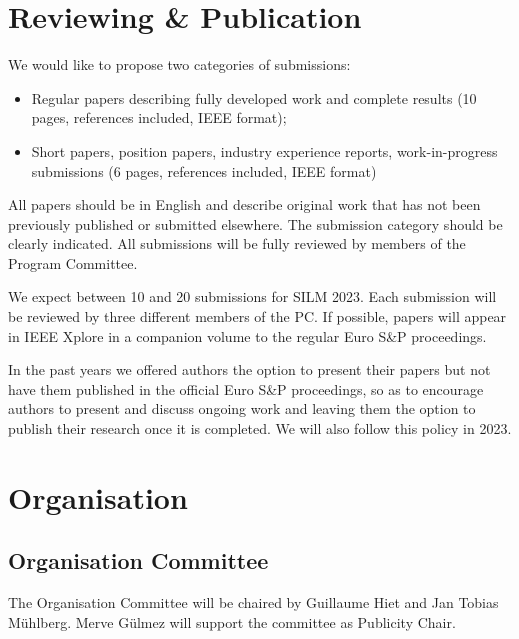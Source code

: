 \documentclass[a4paper,11pt]{article}
\newcommand{\SILMYear}{2023}
\begin{document}
\section{Reviewing \& Publication}
%
We would like to propose two categories of submissions:
%
\begin{itemize}
%
    \item Regular papers describing fully developed work and complete
results (10 pages, references included, IEEE format);
%
    \item Short papers, position papers, industry experience reports,
work-in-progress submissions (6 pages, references included, IEEE format)
%
\end{itemize}

All papers should be in English and describe original work that has not
been previously published or submitted elsewhere. The submission category
should be clearly indicated. All submissions will be fully reviewed by
members of the Program Committee.

We expect between 10 and 20 submissions for SILM \SILMYear{}. Each
submission will be reviewed by three different members of the PC.  If
possible, papers will appear in IEEE Xplore in a companion volume to the
regular Euro S\&P proceedings.

In the past years we offered authors the option to present their papers but
not have them published in the official Euro S\&P proceedings, so as to
encourage authors to present and discuss ongoing work and leaving them the
option to publish their research once it is completed. We will also follow
this policy in \SILMYear{}.


\section{Organisation}
%
\subsection{Organisation Committee}
%
The Organisation Committee will be chaired by Guillaume Hiet and Jan Tobias
M\"uhlberg. Merve G\"ulmez will support the committee as Publicity Chair.
\end{document}
